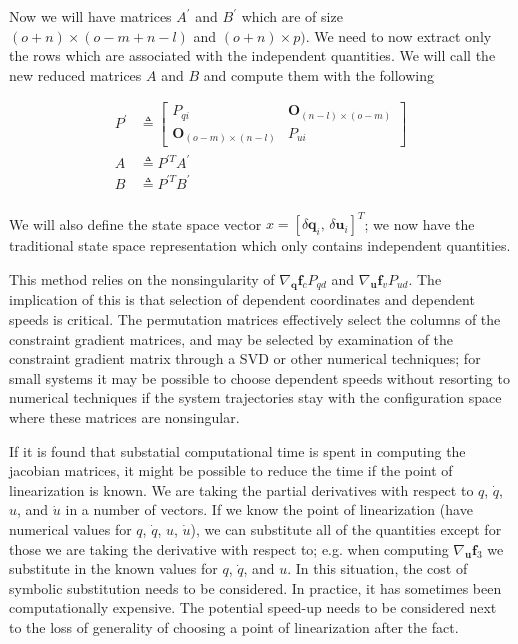 \documentclass{svjour3}                     %
\begin{document}
Now we will have matrices $A^\prime$ and $B^\prime$ which are of size $(o +
n) \times (o - m + n - l)$ and $(o + n) \times p)$. We need to now extract only
the rows which are associated with the independent quantities. We will call the
new reduced matrices $A$ and $B$ and compute them with the following

\begin{align}
    P^\prime &\triangleq \begin{bmatrix}
        P_{qi} & \bm{O}_{(n - l) \times (o - m)} \\
        \bm{O}_{(o - m) \times (n - l)} & P_{ui}
    \end{bmatrix} \\
    A &\triangleq P^{\prime T} A^\prime \\
    B &\triangleq P^{\prime T} B^\prime \\
\end{align}

We will also define the state space vector $x =
\left[\delta\bm{q}_i,\,\delta\bm{u}_i\right]^{T}$; we now have the traditional
state space representation which only contains independent quantities.

This method relies on the nonsingularity of $\nabla_{\bm{q}}\bm{f}_{c} P_{qd}$
and $\nabla_{\bm{u}} \bm{f}_{v} P_{ud}$.  The implication of this is that
selection of dependent coordinates and dependent speeds is critical.  The
permutation matrices effectively select the columns of the constraint gradient
matrices, and may be selected by examination of the constraint gradient matrix
through a SVD or other numerical techniques; for small systems it may be
possible to choose dependent speeds without resorting to numerical techniques
if the system trajectories stay with the configuration space where these
matrices are nonsingular.

If it is found that substatial computational time is spent in computing the
jacobian matrices, it might be possible to reduce the time if the point of
linearization is known. We are taking the partial derivatives with respect to
$q$, $\dot{q}$, $u$, and $\dot{u}$ in a number of vectors. If we know the point
of linearization (have numerical values for $q$, $\dot{q}$, $u$, $\dot{u}$), we
can substitute all of the quantities except for those we are taking the
derivative with respect to; e.g. when computing $\nabla_{\bm{u}} \bm{f}_3$ we
substitute in the known values for $q$, $\dot{q}$, and $u$. In this situation,
the cost of symbolic substitution needs to be considered. In practice, it has
sometimes been computationally expensive. The potential speed-up needs to be
considered next to the loss of generality of choosing a point of linearization
after the fact.
\end{document}
